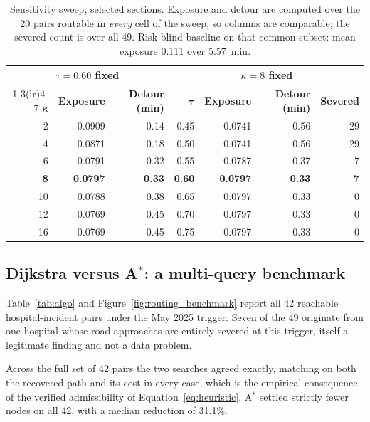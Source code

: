 \documentclass[journal]{IEEEtran}
\begin{document}
\begin{table}[!t]
\centering\footnotesize
\caption{Sensitivity sweep, selected sections. Exposure and detour are computed
over the 20 pairs routable in \emph{every} cell of the sweep, so columns are
comparable; the severed count is over all 49. Risk-blind baseline on that common
subset: mean exposure 0.111 over \SI{5.57}{\minute}.}
\label{tab:sensitivity}
\small
\begin{tabular}{@{}rrr@{\qquad\qquad}rrrr@{}}
\toprule
\multicolumn{3}{c}{\textbf{$\tau = 0.60$ fixed}} &
\multicolumn{4}{c}{\textbf{$\kappa = 8$ fixed}} \\
\cmidrule(lr){1-3}\cmidrule(lr){4-7}
$\boldsymbol{\kappa}$ & \textbf{Exposure} & \textbf{Detour (min)} &
$\boldsymbol{\tau}$ & \textbf{Exposure} & \textbf{Detour (min)} & \textbf{Severed} \\
\midrule
2  & 0.0909 & 0.14 & 0.45 & 0.0741 & 0.56 & 29 \\
4  & 0.0871 & 0.18 & 0.50 & 0.0741 & 0.56 & 29 \\
6  & 0.0791 & 0.32 & 0.55 & 0.0787 & 0.37 & 7 \\
\textbf{8}  & \textbf{0.0797} & \textbf{0.33} & \textbf{0.60} & \textbf{0.0797} & \textbf{0.33} & \textbf{7} \\
10 & 0.0788 & 0.38 & 0.65 & 0.0797 & 0.33 & 0 \\
12 & 0.0769 & 0.45 & 0.70 & 0.0797 & 0.33 & 0 \\
16 & 0.0769 & 0.45 & 0.75 & 0.0797 & 0.33 & 0 \\
\bottomrule
\end{tabular}
\end{table}

\subsection{Dijkstra versus A$^\ast$: a multi-query benchmark}
\label{sec:res-algo}

Table~\ref{tab:algo} and Figure~\ref{fig:routing_benchmark} report all 42
reachable hospital-incident pairs under the May 2025 trigger. Seven of the 49
originate from one hospital whose road approaches are entirely severed at this
trigger, itself a legitimate finding and not a data problem.

Across the full set of 42 pairs the two searches agreed exactly, matching on both
the recovered path and its cost in every case, which is the empirical consequence
of the verified admissibility of Equation~\eqref{eq:heuristic}. A$^\ast$ settled
strictly fewer nodes on all 42, with a median reduction of 31.1\%.
\end{document}

